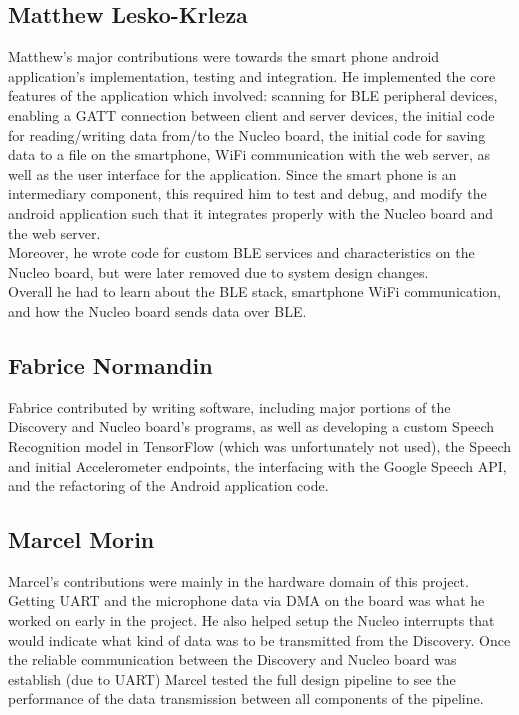 \subsection*{Matthew Lesko-Krleza}
Matthew's major contributions were towards the smart phone android application's implementation, testing and integration. 
He implemented the core features of the application which involved: scanning for BLE peripheral devices, enabling
a GATT connection between client and server devices, the initial code for reading/writing data from/to the Nucleo
board, the initial code for saving data to a file on the smartphone, WiFi communication with the web server, as well as
the user interface for the application. Since the smart phone is an intermediary component, this required him to test and 
debug, and modify the android application such that it integrates properly with the Nucleo board and the web server.\\
Moreover, he wrote code for custom BLE services and characteristics on the Nucleo board, but were later removed due to 
system design changes.\\
Overall he had to learn about the BLE stack, smartphone WiFi communication, and how the Nucleo board sends data over BLE.

\subsection*{Fabrice Normandin}
Fabrice contributed by writing software, including major portions of the Discovery and Nucleo board's programs, as well as developing a custom Speech Recognition model in TensorFlow (which was unfortunately not used), the Speech and initial Accelerometer endpoints, the interfacing with the Google Speech API, and the refactoring of the Android application code.

\subsection*{Marcel Morin}
Marcel's contributions were mainly in the hardware domain of this project. Getting UART and the microphone data via DMA on the board was what he worked on early in the project. He also helped setup the Nucleo interrupts that would indicate what kind of data was to be transmitted from the Discovery. Once the reliable communication between the Discovery and Nucleo board was establish (due to UART) Marcel tested the full design pipeline to see the performance of the data transmission between all components of the pipeline.